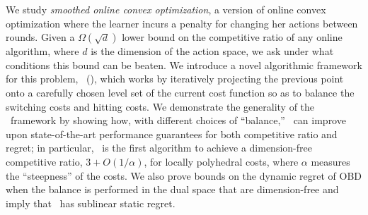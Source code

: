 We study \emph{smoothed online convex optimization}, a version of online convex optimization where the learner incurs a penalty for changing her actions between rounds. Given a $\Omega(\sqrt{d})$ lower bound on the competitive ratio of any online algorithm, where $d$ is the dimension of the action space, we ask under what conditions this bound can be beaten. We introduce a novel algorithmic framework for this problem, \ouralg\ (\ourack), which works by iteratively projecting the previous point onto a carefully chosen level set of the current cost function so as to balance the switching costs and hitting costs. We demonstrate the generality of the \ourack\ framework by showing how, with different choices of ``balance,'' \ourack\ can improve upon state-of-the-art performance guarantees for both competitive ratio and regret; in particular,  \ourack\ is the first algorithm to achieve a dimension-free competitive ratio, $3 + O(1/\alpha)$,  for locally polyhedral costs, where $\alpha$ measures the ``steepness'' of the costs.  We also prove bounds on the dynamic regret of OBD when the balance is performed in the dual space that are dimension-free and imply that \ourack\ has sublinear static regret.

























